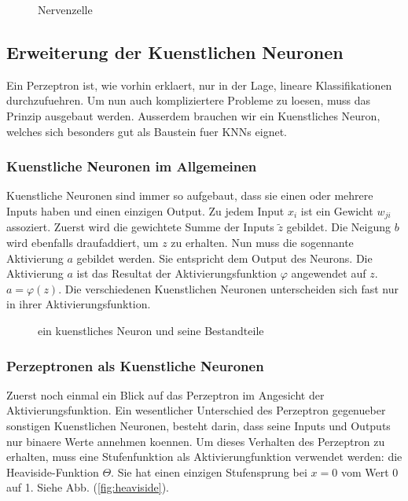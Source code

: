 
\begin{figure}[h!]

  \caption{Nervenzelle}
\end{figure}


\subsection{Erweiterung der Kuenstlichen Neuronen}\label{sec:kuenstlicheNeuronen}
Ein Perzeptron ist, wie vorhin erklaert, nur in der Lage, lineare Klassifikationen
durchzufuehren. Um nun auch kompliziertere Probleme zu loesen, muss das Prinzip
ausgebaut werden. Ausserdem brauchen wir ein Kuenstliches Neuron, welches sich
besonders gut als Baustein fuer KNNs eignet.

\subsubsection{Kuenstliche Neuronen im Allgemeinen}
Kuenstliche Neuronen sind immer so aufgebaut, dass sie einen oder mehrere Inputs
haben und einen einzigen Output. Zu jedem Input $x_i$ ist ein Gewicht
$w_{ji}$ assoziert. Zuerst wird die gewichtete Summe der Inputs $\tilde{z}$ gebildet.
Die Neigung $b$ wird ebenfalls draufaddiert, um $z$ zu erhalten. Nun muss
die sogennante Aktivierung $a$ gebildet werden. Sie entspricht dem Output des Neurons.
Die Aktivierung $a$ ist das Resultat der Aktivierungsfunktion $\varphi$ angewendet
auf $z$. $a = \varphi(z)$. Die verschiedenen Kuenstlichen Neuronen unterscheiden
sich fast nur in ihrer Aktivierungsfunktion.

\begin{figure}[h!]

  \caption{ein kuenstliches Neuron und seine Bestandteile}
\end{figure}

\subsubsection{Perzeptronen als Kuenstliche Neuronen}
Zuerst noch einmal ein Blick auf das Perzeptron im Angesicht der Aktivierungsfunktion.
Ein wesentlicher Unterschied des Perzeptron gegenueber sonstigen Kuenstlichen
Neuronen, besteht darin, dass seine Inputs und Outputs nur binaere Werte
annehmen koennen. Um dieses Verhalten des Perzeptron zu erhalten,
muss eine Stufenfunktion als Aktivierungfunktion verwendet werden: die Heaviside-Funktion $\Theta$.
Sie hat einen einzigen Stufensprung bei $x=0$ vom Wert 0 auf 1. Siehe Abb. (\ref{fig:heaviside}).

